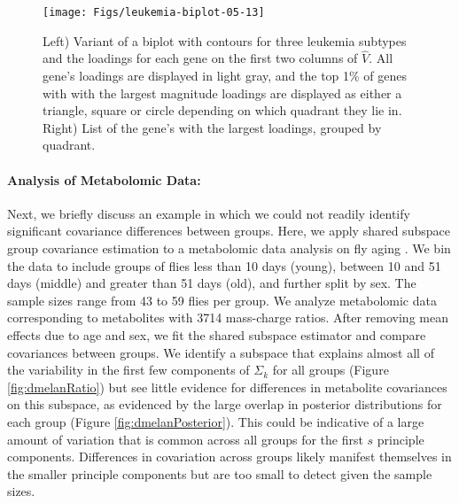 \documentclass[12pt]{article}
\begin{document}
  \begin{figure}[!ht]
    \centering
    \texttt{[image: Figs/leukemia-biplot-05-13]}
    \qquad
\raisebox{1.25\height}{
\footnotesize

}
\caption{Left) Variant of a biplot with contours for three leukemia
  subtypes and the loadings for each gene on the first two columns of
  $\hat{V}$.  All gene's loadings are displayed in light gray, and the
  top 1\% of genes with with the largest magnitude loadings are
  displayed as either a triangle, square or circle depending on which
  quadrant they lie in.  Right) List of the gene's with the largest
  loadings, grouped by quadrant. }
\label{fig:leukemiaBiplot}
  \end{figure}

\paragraph{Analysis of Metabolomic Data:}

Next, we briefly discuss an example in which we could not readily identify
significant covariance differences between groups.  Here, we apply
shared subspace group covariance estimation to a metabolomic data
analysis on fly aging \citep{Hoffman2014}.  We bin the data to include
groups of flies less than 10 days (young), between 10 and 51 days
(middle) and greater than 51 days (old), and further split by
sex. The sample sizes range from 43 to 59 flies per group.  We
analyze metabolomic data corresponding to metabolites with 3714
mass-charge ratios.  After removing mean effects due to age and
sex, we fit the shared subspace estimator and compare covariances
between groups.  We identify a subspace that explains almost all of
the variability in the first few components of $\Sigma_k$ for all
groups (Figure \ref{fig:dmelanRatio}) but see little evidence for
differences in metabolite covariances on this subspace, as evidenced
by the large overlap in posterior distributions for each group (Figure
\ref{fig:dmelanPosterior}). This could be indicative of a large amount
of variation that is common across all groups for the first $s$
principle components. Differences in covariation across groups likely
manifest themselves in the smaller principle components but are too
small to detect given the sample sizes.
\end{document}
